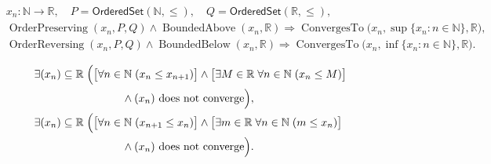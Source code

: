 \begin{remark*}
\[
\begin{aligned}
&x_n\colon\mathbb{N}\to\mathbb{R},\quad
P=\mathsf{OrderedSet}(\mathbb{N},\leq),\quad
Q=\mathsf{OrderedSet}(\mathbb{R},\leq),\\
&\operatorname{OrderPreserving}(x_n,P,Q)
\land
\operatorname{BoundedAbove}(x_n,\mathbb{R})
\Longrightarrow
\operatorname{ConvergesTo}\bigl(x_n,\sup\{x_n:n\in\mathbb{N}\},\mathbb{R}\bigr),\\
&\operatorname{OrderReversing}(x_n,P,Q)
\land
\operatorname{BoundedBelow}(x_n,\mathbb{R})
\Longrightarrow
\operatorname{ConvergesTo}\bigl(x_n,\inf\{x_n:n\in\mathbb{N}\},\mathbb{R}\bigr).
\end{aligned}
\]
\end{remark*}

\begin{remark*}
\[
\begin{aligned}
&\exists (x_n)\subseteq\mathbb{R}\;\Bigl(
  \bigl[\forall n\in\mathbb{N}\;(x_n\le x_{n+1})\bigr]
  \land
  \bigl[\exists M\in\mathbb{R}\;\forall n\in\mathbb{N}\;(x_n\le M)\bigr]\\
&\qquad\qquad\qquad\qquad
  \land
  \text{$(x_n)$ does not converge}
\Bigr),\\
&\exists (x_n)\subseteq\mathbb{R}\;\Bigl(
  \bigl[\forall n\in\mathbb{N}\;(x_{n+1}\le x_n)\bigr]
  \land
  \bigl[\exists m\in\mathbb{R}\;\forall n\in\mathbb{N}\;(m\le x_n)\bigr]\\
&\qquad\qquad\qquad\qquad
  \land
  \text{$(x_n)$ does not converge}
\Bigr).
\end{aligned}
\]
\end{remark*}

